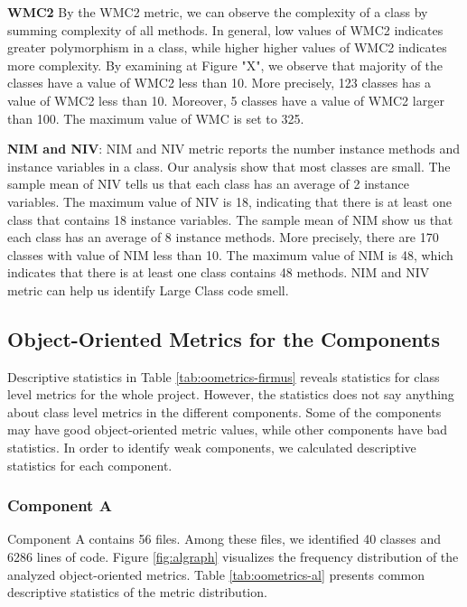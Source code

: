 \textbf{WMC2} By the WMC2 metric, we can observe the complexity of a class by summing complexity of all methods. In general, low values of WMC2 indicates greater polymorphism in a class, while higher higher values of WMC2 indicates more complexity. By examining at Figure "X", we observe that majority of the classes have a value of WMC2 less than 10. More precisely, 123 classes has a value of WMC2 less than 10. Moreover, 5 classes have a value of WMC2 larger than 100. The maximum value of WMC is set to 325.



\textbf{NIM and NIV}: NIM and NIV metric reports the number instance methods and instance variables in a class. Our analysis show that most classes are small. The sample mean of NIV tells us that each class has an average of 2 instance variables. The maximum value of NIV is 18, indicating that there is at least one class that contains 18 instance variables. The sample mean of NIM show us that each class has an average of 8 instance methods. More precisely, there are 170 classes with value of NIM less than 10. The maximum value of NIM is 48, which indicates that there is at least one class contains 48 methods. NIM and NIV metric can help us identify Large Class code smell.



\subsection{Object-Oriented Metrics for the Components}
Descriptive statistics in Table \ref{tab:oometrics-firmus} reveals statistics for class level metrics for the whole project. However, the statistics does not say anything about class level metrics in the different components. Some of the components may have good object-oriented metric values, while other components have bad statistics. In order to identify weak components, we calculated descriptive statistics for each component. 

\subsubsection{Component A}
Component A contains 56 files. Among these files, we identified 40 classes and 6286 lines of code. Figure \ref{fig:algraph} visualizes the frequency distribution of the analyzed object-oriented metrics. Table \ref{tab:oometrics-al} presents common descriptive statistics of the metric distribution.

